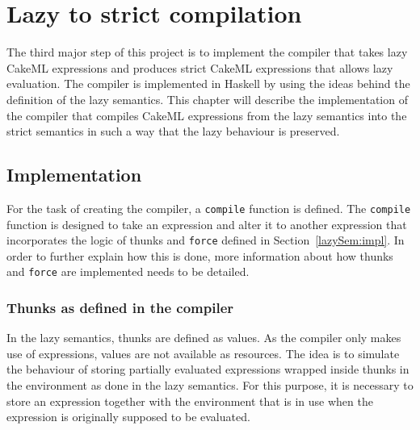 \chapter{Lazy to strict compilation}
\label{chapter:compiler}
The third major step of this project is to implement the compiler that takes
lazy CakeML expressions and produces strict CakeML expressions that allows
lazy evaluation. The compiler is implemented in Haskell by using the ideas
behind the definition of the lazy semantics. This chapter will describe the
implementation of the compiler that compiles CakeML expressions from the lazy
semantics into the strict semantics in such a way that the lazy behaviour
is preserved.

\section{Implementation}

For the task of creating the compiler, a \texttt{compile} function is defined.
The \texttt{compile} function is designed to take an expression and alter it to
another expression that incorporates the logic of thunks and \texttt{force} defined in
Section~\ref{lazySem:impl}. In order to further explain how this is done,
more information about how thunks and \texttt{force} are implemented needs to
be detailed.

\subsection{Thunks as defined in the compiler}
\label{comp:thunk}
In the lazy semantics, thunks are defined as values. As the compiler only makes
use of expressions, values are not available as resources.
The idea is to simulate the behaviour of storing partially evaluated expressions
wrapped inside thunks in the environment as done in the lazy semantics.
For this purpose, it is necessary to store an expression
together with the environment that is in use when the expression is originally
supposed to be evaluated.

